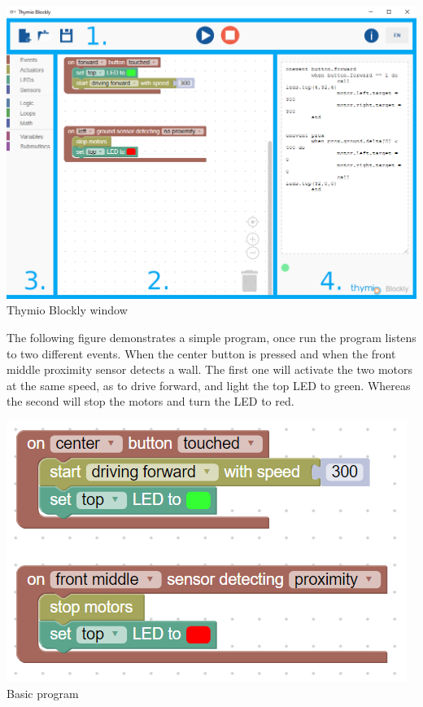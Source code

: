\documentclass{scrbook}
\begin{document}
\begin{center}
  \includegraphics[scale=0.5]{./Blockly/blockly_window}\\
  Thymio Blockly window
\end{center}

The following figure demonstrates a simple program, once run the program listens to two different events. When the center button is pressed and when the front middle proximity sensor detects a wall. 
The first one will activate the two motors at the same speed, as to drive forward, and light the top LED to green. Whereas the second will stop the motors and turn the LED to red. \\
\begin{center}
  \includegraphics[scale=0.5]{./Blockly/forward_stop_wall}\\
  Basic program
\end{center}
\end{document}
